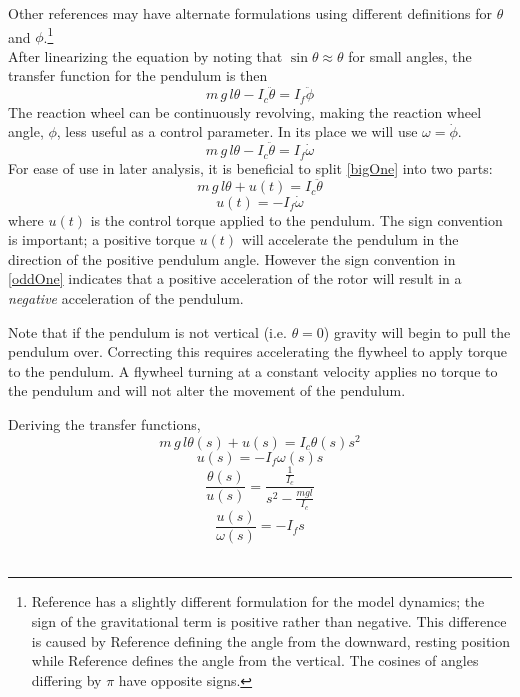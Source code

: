 \documentclass[12pt,letterpaper]{article}
\begin{document}
Other references may have alternate formulations using different definitions for $\theta$ and $\phi$.\footnote{Reference \cite{monograph} has a slightly different formulation for the model dynamics; 
the sign of the gravitational term is positive rather than negative.  This difference is caused 
by Reference \cite{monograph} defining the angle from the downward, resting position
while Reference \cite{reactionWheel} defines the angle from the vertical.  
The cosines of angles differing by $\pi$ have opposite signs.}\\


After linearizing the equation by noting that $\sin{\theta} \approx \theta$ for small angles, 
the transfer function for the pendulum is then
%
\begin{equation}
    m \,g \,l \theta - I_{c}\ddot{\theta}  = I_{f}\ddot{\phi}
\end{equation}
%
The reaction wheel can be continuously revolving, making the reaction wheel angle, $\phi$, less useful as a control parameter.
In its place we will use $\omega = \dot{\phi}$.
%
\begin{equation}
    m \,g \,l \theta - I_{c}\ddot{\theta}  = I_{f}\dot{\omega}\label{bigOne}
\end{equation}
%
For ease of use in later analysis, it is beneficial to split \eqref{bigOne} into two parts:
%
\begin{equation}
    m \,g \,l \theta + u(t)   = I_{c}\ddot{\theta}
\end{equation}
%
\begin{equation}
    u(t) = -I_{f}\dot{\omega}\label{oddOne}
\end{equation}
%
where $u(t)$ is the control torque applied to the pendulum.  The sign convention is important; a positive torque $u(t)$
will accelerate the pendulum in the direction of the positive pendulum angle.  However the sign convention in 
\eqref{oddOne} indicates that  a positive acceleration of the rotor will result in a \textit{negative} acceleration of the pendulum.

Note that if the pendulum is not vertical (i.e. $\theta = 0$) gravity will begin to pull the pendulum over.  Correcting this requires accelerating the flywheel to apply torque to the pendulum.  A flywheel turning at a constant velocity applies no torque to the pendulum and will not alter the movement of the pendulum.

Deriving the transfer functions,
%
\begin{equation}
    m \,g \,l \theta(s) + u(s) = I_{c}\theta(s) s^{2}
\end{equation}
%
\begin{equation}
    u(s)  = -I_{f}\omega(s) s
\end{equation}
%
\begin{equation}
    \frac{\theta(s)}{u(s)}= \frac{\frac{1}{I_{c}}}{s^{2} - \frac{m g l}{I_{c}} }
    \label{franco}
\end{equation}
%
\begin{equation}
    \frac{u(s)}{\omega(s)} = -I_{f} s
    \label{groucho}
\end{equation}\\
\end{document}
